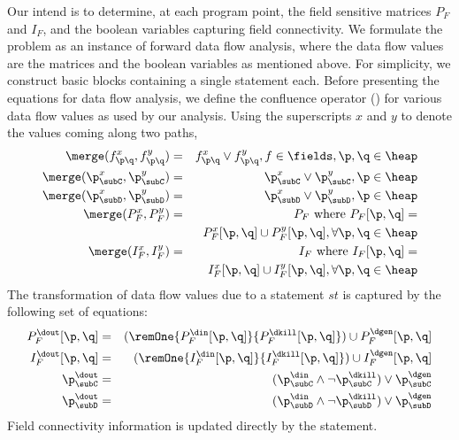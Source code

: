 Our intend is to determine, at each program point, the field
sensitive matrices $P_F$ and $I_F$, and the
boolean variables capturing field connectivity. We formulate
the problem as an instance of forward data flow analysis,
where the data flow values are the matrices and the boolean
variables as mentioned above.  For simplicity, we construct
basic blocks containing a single statement each. Before
presenting the equations for data flow analysis, we define
the confluence operator (\merge) for various data flow values
as used by our analysis. Using the superscripts $x$ and $y$
to denote the values coming along two paths,
\begin{eqnarray*}
  \merge( f_{\p\q}^x, f_{\p\q}^y ) &=& f_{\p\q}^x \vee f_{\p\q}^y , f \in \fields,
  \p,\q \in \heap \\
   \merge(\p_{\subC}^x, \p_{\subC}^y) &=& \p_{\subC}^x \vee
   \p_{\subC}^y, \p \in \heap \\
   \merge(\p_{\subD}^x, \p_{\subD}^y) &=& \p_{\subD}^x \vee
   \p_{\subD}^y, \p \in \heap \\
   \merge(P_F^{x}, P_F^{y}) &=& P_F \mbox{ where }
   P_F[{\p}, {\q}]  = \\ 
   && P_F^{x}[{\p}, {\q}] \cup
   P_F^{y}[{\p}, {\q}],   \forall {\p}, {\q} \in \heap\\ 
   \merge(I_F^{x}, I_F^{y}) &=& I_F \mbox{ where }
   I_F[{\p}, {\q}]  = \\
   && I_F^{x}[{\p}, {\q}] \cup
    I_F^{y}[{\p}, {\q}],  \forall {\p}, {\q} \in \heap
\end{eqnarray*}
The transformation of data flow values due to a statement
$st$ is captured by the following set of equations:
\begin{eqnarray*}
  P_F^{\dout}[\p,\q] &=& (\remOne{P_F^{\din}[\p,\q]}{P_F^{\dkill}[\p,\q]}) \cup
  P_F^{\dgen}[\p,\q] \\
  I_F^{\dout}[\p,\q] &=& (\remOne{I_F^{\din}[\p,\q]}{I_F^{\dkill}[\p,\q]}) \cup
  I_F^{\dgen}[\p,\q] \\
  \p_{\subC}^{\dout} &=& (\p_{\subC}^{\din} \wedge
  \neg\p_{\subC}^{\dkill} ) \vee \p_{\subC}^{\dgen}  \\
  \p_{\subD}^{\dout} &=& (\p_{\subD}^{\din} \wedge
  \neg\p_{\subD}^{\dkill} ) \vee \p_{\subD}^{\dgen} 
\end{eqnarray*}
Field connectivity information is updated directly by the
statement. 

